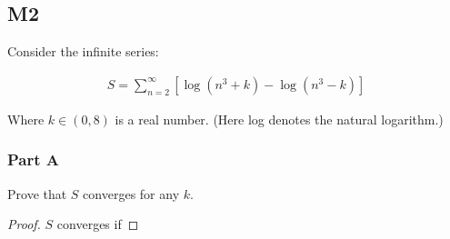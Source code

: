 \subsection*{M2}

Consider the infinite series:

\begin{gather} \label{eq:m2}
    S = \sum_{n=2}^{\infty} [\log{(n^3 + k)} - \log{(n^3 - k)}]
\end{gather}

Where $k \in (0, 8)$ is a real number. (Here log denotes the natural logarithm.)

\subsubsection*{Part A}

Prove that $S$ converges for any $k$.

\begin{proof}
    $S$ converges if
\end{proof}